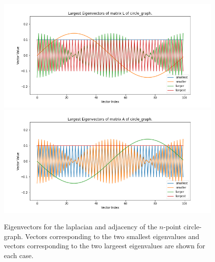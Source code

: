 \documentclass[12pt]{article}
\begin{document}
\begin{enumerate}[label=(\alph*)]
      \begin{figure}[!ht]
        \centering
        \includegraphics[scale=0.3]{figures/eigenvectors_circle_graph_L.png}
        \includegraphics[scale=0.3]{figures/eigenvectors_circle_graph_A.png}
        \caption{Eigenvectors for the laplacian and adjacency of the $n$-point circle-graph. Vectors corresponding to the two smallest eigenvalues and vectors corresponding to the two largeest eigenvalues are shown for each case.}
        \label{fig:circle_graph}
      \end{figure}


\end{enumerate}
\end{document}
